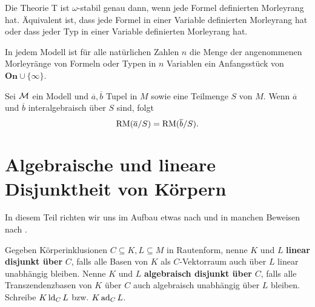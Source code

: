 	\begin{fact}
		Die Theorie T ist $\omega$-stabil genau dann, wenn jede Formel definierten Morleyrang hat. Äquivalent ist, dass jede Formel in einer Variable definierten Morleyrang hat oder dass jeder Typ in einer Variable definierten Morleyrang hat.
	\end{fact}
	
	\begin{fact}
		In jedem Modell ist für alle natürlichen Zahlen $n$ die Menge der angenommenen Morleyränge von Formeln oder Typen in $n$ Variablen ein Anfangsstück von $\textbf{On}\cup\{\infty\}$.
	\end{fact}
	
	\begin{fact}
		Sei $\mathcal{M}$ ein Modell und $\overline{a},\overline{b}$ Tupel in $M$ sowie eine Teilmenge $S$ von $M$. Wenn $\overline{a}$ und $\overline{b}$ interalgebraisch über $S$ sind, folgt $$\operatorname{RM}(\overline{a}/S)=\operatorname{RM}(\overline{b}/S).$$
	\end{fact}
	
	\section{Algebraische und lineare Disjunktheit von Körpern}
	In diesem Teil richten wir uns im Aufbau etwas nach \cite{Delon} und in manchen Beweisen nach \cite{SergeLang}.
	
    \begin{definition}
    	Gegeben Körperinklusionen $C\subseteq K,L\subseteq M$ in Rautenform, nenne $K$ und $L$ \textbf{linear disjunkt über } $C$, falls alle Basen von $K$ als $C$-Vektorraum auch über $L$ linear unabhängig bleiben. Nenne $K$ und $L$ \textbf{algebraisch disjunkt über} $C$, falls alle Transzendenzbasen von $K$ über $C$ auch algebraisch unabhängig über $L$ bleiben. Schreibe $K\operatorname{ld}_CL$ bzw. $K\operatorname{ad}_CL$.
    \end{definition}
    

